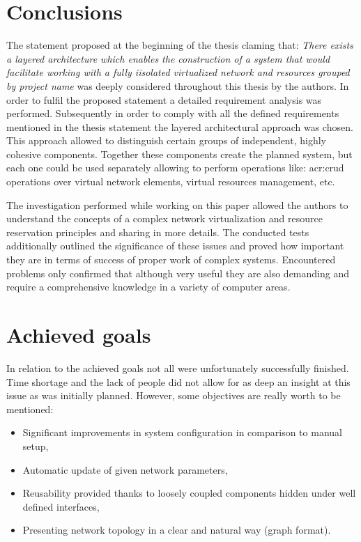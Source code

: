 \documentclass[11pt,openany]{book}
\begin{document}
    \section{Conclusions}
		\label{sub:sum:concl}
		
      The statement proposed at the beginning of the thesis claming that: \emph{There exists a layered architecture which
      enables the construction of a system that would facilitate working with a fully iisolated virtualized network and
      resources grouped by project name} was deeply considered throughout this thesis by the authors.  In order to
      fulfil the proposed statement a detailed requirement analysis was performed. Subsequently in order to comply with all
      the defined requirements mentioned in the thesis statement the layered architectural approach was chosen. This approach
      allowed to distinguish certain groups of independent, highly cohesive components. Together these components create
      the planned system, but each one could be used separately allowing to perform operations like: \gls{acr:crud}
      operations over virtual network elements, virtual resources management, etc. 
      
      The investigation performed while working on this paper allowed the authors to understand the concepts of a complex network
      virtualization and resource reservation principles and sharing in more details. The conducted tests additionally outlined the
      significance of these issues and proved how important they are in terms of success of proper work of complex systems.
      Encountered problems only confirmed that although very useful they are also demanding and require a comprehensive
      knowledge in a variety of computer areas. 

      
    \section{Achieved goals}
		\label{sub:sum:achieved}

		
      In relation to the achieved goals not all were unfortunately successfully finished. Time shortage and the lack of people
      did not allow for as deep an insight at this issue as was initially planned. However, some objectives are really
      worth to be mentioned:
      
      \begin{itemize}
        \item Significant improvements in system configuration in comparison to manual setup,
        \item Automatic update of given network parameters,
        \item Reusability provided thanks to loosely coupled components hidden under well defined interfaces,
        \item Presenting network topology in a clear and natural way (graph format).
      \end{itemize}
		
\end{document}
